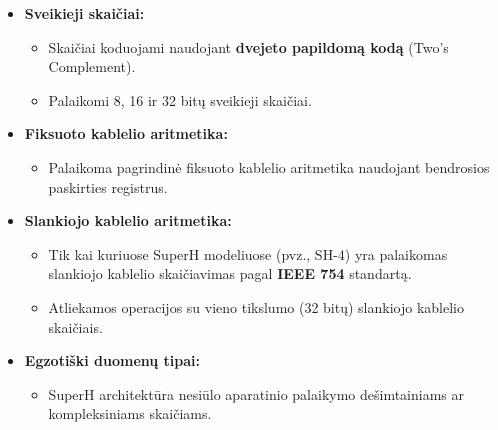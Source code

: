 \documentclass{article}
\begin{document}
\begin{itemize}
    \item \textbf{Sveikieji skaičiai:}
        \begin{itemize}
            \item Skaičiai koduojami naudojant \textbf{dvejeto papildomą kodą} (Two's Complement).
            \item Palaikomi 8, 16 ir 32 bitų sveikieji skaičiai.
        \end{itemize}
    \item \textbf{Fiksuoto kablelio aritmetika:}
        \begin{itemize}
            \item Palaikoma pagrindinė fiksuoto kablelio aritmetika naudojant bendrosios paskirties registrus.
        \end{itemize}
    \item \textbf{Slankiojo kablelio aritmetika:}
        \begin{itemize}
            \item Tik kai kuriuose SuperH modeliuose (pvz., SH-4) yra palaikomas slankiojo kablelio skaičiavimas pagal \textbf{IEEE 754} standartą.
            \item Atliekamos operacijos su vieno tikslumo (32 bitų) slankiojo kablelio skaičiais.
        \end{itemize}
    \item \textbf{Egzotiški duomenų tipai:}
        \begin{itemize}
            \item SuperH architektūra nesiūlo aparatinio palaikymo dešimtainiams ar kompleksiniams skaičiams.
        \end{itemize}
\end{itemize}
\end{document}

